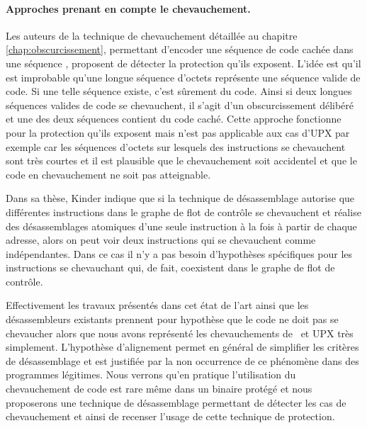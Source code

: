 \paragraph{Approches prenant en compte le chevauchement.}
Les auteurs de la technique de chevauchement détaillée au chapitre \ref{chap:obscurcissement}, permettant d'encoder une séquence de code cachée dans une séquence \cite{JLH13}, proposent de détecter  la protection qu'ils exposent. 
L'idée est qu'il est improbable qu'une longue séquence d'octets représente une séquence valide de code. 
Si une telle séquence existe, c'est sûrement du code. Ainsi si deux longues séquences valides de code se chevauchent, il s'agit d'un obscurcissement délibéré et une des deux séquences contient du code caché. 
Cette approche fonctionne pour la protection qu'ils exposent mais n'est pas applicable aux cas d'UPX par exemple car les séquences d'octets sur lesquels des instructions se chevauchent sont très courtes et il est plausible que le chevauchement soit accidentel et que le code en chevauchement ne soit pas atteignable.

Dans sa thèse, Kinder \cite{Kinder10} indique que si la technique de désassemblage autorise que différentes instructions dans le graphe de flot de contrôle se chevauchent et réalise des désassemblages atomiques d'une seule instruction à la fois à partir de chaque adresse, alors on peut voir deux instructions qui se chevauchent comme indépendantes.
Dans ce cas il n'y a pas besoin d'hypothèses spécifiques pour les instructions se chevauchant qui, de fait, coexistent dans le graphe de flot de contrôle.

Effectivement les travaux présentés dans cet état de l'art ainsi que les désassembleurs existants prennent pour hypothèse que le code ne doit pas se chevaucher alors que nous avons représenté les chevauchements de \telock\ et UPX très simplement. 
L'hypothèse d'alignement permet en général de simplifier les critères de désassemblage et est justifiée par la non occurrence de ce phénomène dans des programmes légitimes.
Nous verrons qu'en pratique l'utilisation du chevauchement de code est rare même dans un binaire protégé et nous proposerons une technique de désassemblage permettant de détecter les cas de chevauchement et ainsi de recenser l'usage de cette technique de protection.

